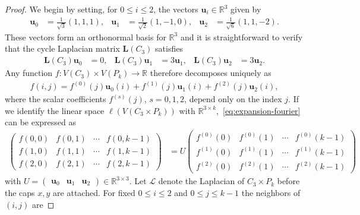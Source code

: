 \documentclass[11pt,a4paper]{amsart}
\begin{document}
\begin{proof}
    We begin by setting, for $0\leq i\leq 2$, the vectors $\mathbf{u}_i\in\mathbb{R}^3$ given by
        \begin{align*}
            \mathbf{u}_0&=\tfrac1{\sqrt3}(1,1,1),&
            \mathbf{u}_1&=\tfrac1{\sqrt2}(1,-1,0),&
            \mathbf{u}_2&=\tfrac1{\sqrt6}(1,1,-2).
        \end{align*}
    These vectors form an orthonormal basis for $\mathbb{R}^3$ and it is straightforward to verify that the cycle Laplacian matrix $\mathbf{L}(C_3)$ satisfies
        \begin{align*}
            \mathbf{L}({C_3})\mathbf{u}_0&=0,& 
            \mathbf{L}({C_3})\mathbf{u}_1&=3\mathbf{u}_1,&
            \mathbf{L}({C_3})\mathbf{u}_2&=3\mathbf{u}_2.
        \end{align*}
    Any function $f:V(C_3)\times V(P_k)\to\mathbb R$ therefore decomposes uniquely as
        \begin{align}\label{eq:expansion-fourier}
        f(i,j)=
            f^{(0)}(j)\mathbf{u}_0(i)+f^{(1)}(j)\mathbf{u}_1(i)+f^{(2)}(j)\mathbf{u}_2(i),
        \end{align}
    where the scalar coefficients $f^{(s)}(j)$, $s=0,1,2$, depend only on
    the index $j$. If we identify the linear space $\ell(V(C_3\times P_k))$ with $\mathbb{R}^{3\times k}$,~\cref{eq:expansion-fourier} can be expressed as
        \begin{align*}
            \begin{pmatrix}
            f(0,0) & f(0,1) & \cdots & f(0,k-1)\\
            f(1,0) & f(1,1) & \cdots & f(1,k-1)\\
            f(2,0) & f(2,1) & \cdots & f(2,k-1)
            \end{pmatrix}
            &=
            U
            \begin{pmatrix}
            f^{(0)}(0) & f^{(0)}(1) & \cdots & f^{(0)}(k-1)\\
            f^{(1)}(0) & f^{(1)}(1) & \cdots & f^{(1)}(k-1)\\
            f^{(2)}(0) & f^{(2)}(1) & \cdots & f^{(2)}(k-1)
            \end{pmatrix}
        \end{align*}
    with $U = \begin{pmatrix}
        \mathbf{u}_0 & \mathbf{u}_1 & \mathbf{u}_2
    \end{pmatrix}\in\mathbb{R}^{3\times 3}$. Let $\mathcal L$ denote the Laplacian of $C_3\times P_k$ {before} the caps $x,y$ are attached. For fixed $0\leq i \leq 2$ and $0\leq j\leq k-1$ the neighbors of $(i,j)$ are

\end{proof}
\end{document}
